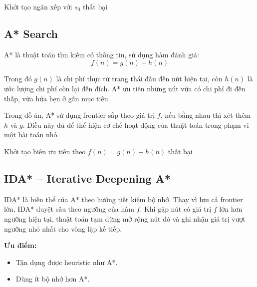 \documentclass[a4paper,12pt]{article}
\begin{document}
\begin{algorithm}[H]
\caption{DFS}
Khởi tạo ngăn xếp với $s_0$\;
\Return thất bại\;
\end{algorithm}

\subsection{A* Search}

A* là thuật toán tìm kiếm có thông tin, sử dụng hàm đánh giá:
\[
f(n) = g(n) + h(n)
\]

Trong đó \(g(n)\) là chi phí thực từ trạng thái đầu đến nút hiện tại, còn \(h(n)\) là ước lượng chi phí còn lại đến đích. A* ưu tiên những nút vừa có chi phí đi đến thấp, vừa hứa hẹn ở gần mục tiêu.

Trong đồ án, A* sử dụng frontier sắp theo giá trị \(f\), nếu bằng nhau thì xét thêm \(h\) và \(g\). Điều này đủ để thể hiện cơ chế hoạt động của thuật toán trong phạm vi một bài toán nhỏ.

\begin{algorithm}[H]
\caption{A* Search}
Khởi tạo biên ưu tiên theo $f(n)=g(n)+h(n)$\;
\Return thất bại\;
\end{algorithm}

\subsection{IDA* -- Iterative Deepening A*}

IDA* là biến thể của A* theo hướng tiết kiệm bộ nhớ. Thay vì lưu cả frontier lớn, IDA* duyệt sâu theo ngưỡng của hàm \(f\). Khi gặp nút có giá trị \(f\) lớn hơn ngưỡng hiện tại, thuật toán tạm dừng mở rộng nút đó và ghi nhận giá trị vượt ngưỡng nhỏ nhất cho vòng lặp kế tiếp.

\textbf{Ưu điểm:}
\begin{itemize}
    \item Tận dụng được heuristic như A*.
    \item Dùng ít bộ nhớ hơn A*.
\end{itemize}
\end{document}
